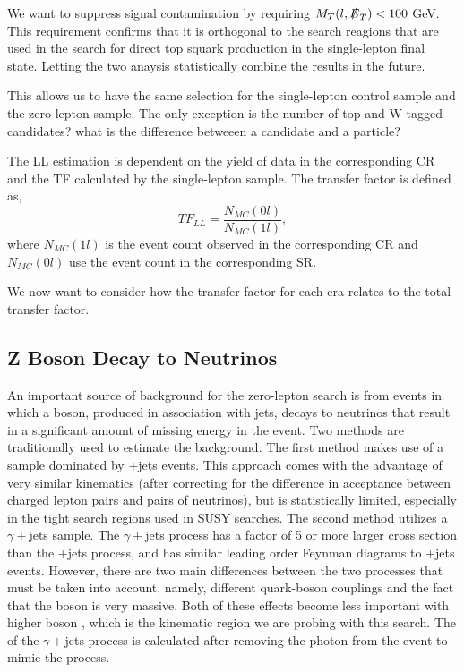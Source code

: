 We want to suppress signal contamination by requiring $M_{T}(l, \slashed{E}_{T}) < 100$ GeV. This requirement confirms that it is orthogonal to the search reagions that are used in the search for direct top squark production in the single-lepton final state. Letting the two anaysis statistically combine the results in the future. 

This allows us to have the same selection for the single-lepton control sample and the zero-lepton sample. The only exception is the number of top and W-tagged candidates? what is the difference betweeen a candidate and a particle?

The LL estimation is dependent on the yield of data in the corresponding CR and the TF calculated by the single-lepton sample. The transfer factor is defined as, 
\begin{equation}
\label{eqn:TF}
TF_{LL}=\frac{N_{MC}(0l)}{N_{MC}(1l)},
\end{equation}
where $N_{MC}(1l)$ is the event count observed in the corresponding CR and $N_{MC}(0l)$ use the event count in the corresponding SR. 

We now want to consider how the transfer factor for each era relates to the total transfer factor. 







\subsection{Z Boson Decay to Neutrinos}
\label{subsec:Znunu}

An important source of background for the zero-lepton search is from events in which a \Z{} boson, produced in association with jets, decays to neutrinos that result in a significant amount of missing energy in the event. Two methods are traditionally used to estimate the \Znunu{} background. The first method makes use of a sample dominated by \Zll+jets events. This approach comes with the advantage of very similar kinematics (after correcting for the difference in acceptance between charged lepton pairs and pairs of neutrinos), but is statistically limited, especially in the tight search regions used in SUSY searches. The second method utilizes a $\gamma+$jets sample. The $\gamma+$jets process has a factor of 5 or more larger cross section than the \Zll+jets process, and has similar leading order Feynman diagrams to \Z+jets events. However, there are two main differences between the two processes that must be taken into account, namely, different quark-boson couplings and the fact that the \Z{} boson is very massive. Both of these effects become less important with higher boson \pt, which is the kinematic region we are probing with this search. The \met{} of the $\gamma+$jets process is calculated after removing the photon from the event to mimic the \Znunu{} process.

